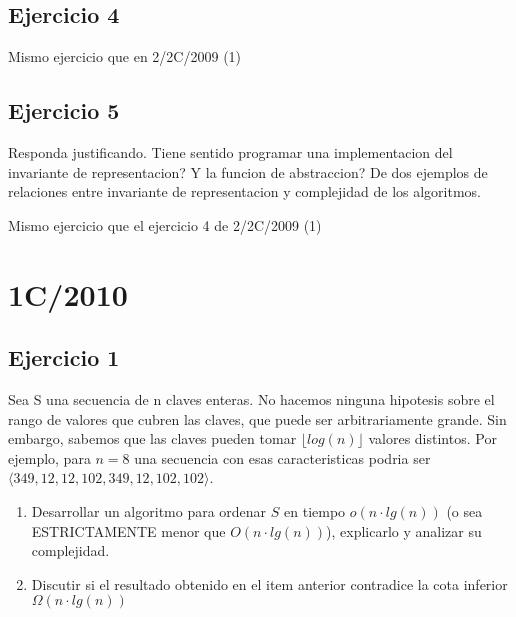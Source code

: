\documentclass[10pt, a4paper]{article}
\begin{document}
\subsection*{Ejercicio 4}

Mismo ejercicio que en 2/2C/2009 (1)

\subsection*{Ejercicio 5}

Responda justificando.
Tiene sentido programar una implementacion del invariante de representacion?
Y la funcion de abstraccion?
De dos ejemplos de relaciones entre invariante de representacion y complejidad de los algoritmos.

Mismo ejercicio que el ejercicio 4 de 2/2C/2009 (1)

\newpage
\section{1C/2010}

\subsection*{Ejercicio 1}

Sea S una secuencia de n claves enteras. No hacemos ninguna hipotesis sobre el rango de valores que cubren las claves, que puede ser arbitrariamente grande. Sin embargo, sabemos que las claves pueden tomar $\lfloor log(n) \rfloor$ valores distintos. Por ejemplo, para $n=8$ una secuencia con esas caracteristicas podria ser $\langle349, 12, 12, 102, 349, 12, 102, 102\rangle$.

\begin{enumerate}
 \item Desarrollar un algoritmo para ordenar $S$ en tiempo $o(n\cdot lg(n))$ (o sea ESTRICTAMENTE menor que $O(n\cdot lg(n))$), explicarlo y analizar su complejidad.
 \item Discutir si el resultado obtenido en el item anterior contradice la cota inferior $\Omega(n\cdot lg(n))$
\end{enumerate}
\end{document}
